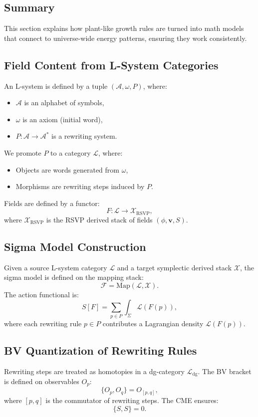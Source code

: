 \documentclass[11pt,oneside]{memoir}
\theoremstyle{plain}
\newcommand{\F}{\mathcal{F}}
\newcommand{\X}{\mathcal{X}}
\newcommand{\A}{\mathcal{A}}
\newcommand{\L}{\mathcal{L}}
\begin{document}
\subsection{Summary}
This section explains how plant-like growth rules are turned into math models that connect to universe-wide energy patterns, ensuring they work consistently.

\subsection{Field Content from L-System Categories}
An L-system is defined by a tuple \((\A, \omega, P)\), where:
\begin{itemize}
    \item \(\A\) is an alphabet of symbols,
    \item \(\omega\) is an axiom (initial word),
    \item \(P: \A \to \A^*\) is a rewriting system.
\end{itemize}
We promote \(P\) to a category \(\L\), where:
\begin{itemize}
    \item Objects are words generated from \(\omega\),
    \item Morphisms are rewriting steps induced by \(P\).
\end{itemize}
Fields are defined by a functor:
\begin{equation}
    F : \L \longrightarrow \X_{\mathrm{RSVP}},
\end{equation}
where \(\X_{\mathrm{RSVP}}\) is the RSVP derived stack of fields \((\phi, \mathbf{v}, S)\).

\subsection{Sigma Model Construction}
Given a source L-system category \(\L\) and a target symplectic derived stack \(\X\), the sigma model is defined on the mapping stack:
\begin{equation}
    \F = \mathrm{Map}(\L, \X).
\end{equation}
The action functional is:
\begin{equation}
    S[F] = \sum_{p \in P} \int_\Sigma \mathcal{L}(F(p)),
\end{equation}
where each rewriting rule \(p \in P\) contributes a Lagrangian density \(\mathcal{L}(F(p))\).

\subsection{BV Quantization of Rewriting Rules}
Rewriting steps are treated as homotopies in a dg-category \(\L_{\mathrm{dg}}\). The BV bracket is defined on observables \(O_p\):
\begin{equation}
    \{O_p, O_q\} = O_{[p,q]},
\end{equation}
where \([p,q]\) is the commutator of rewriting steps. The CME ensures:
\begin{equation}
    \{ S, S \} = 0.
\end{equation}
\end{document}
